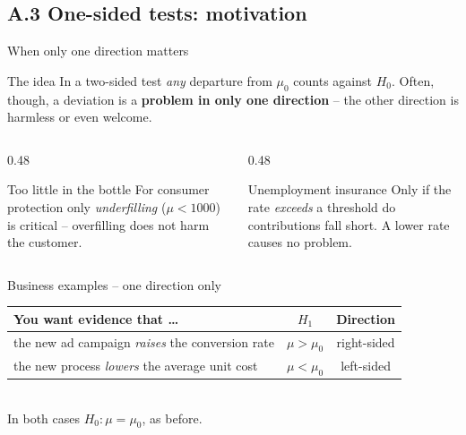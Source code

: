 \documentclass[aspectratio=169,11pt]{beamer}
\begin{document}

\subsection{A.3 One-sided tests: motivation}

\begin{frame}{When only one direction matters}
  \begin{block}{The idea}
    In a two-sided test \emph{any} departure from $\mu_0$ counts against
    $H_0$. Often, though, a deviation is a \textbf{problem in only one
    direction} -- the other direction is harmless or even welcome.
  \end{block}
  \begin{columns}[T]
    \begin{column}{0.48\textwidth}
      \begin{exampleblock}{Too little in the bottle}
        For consumer protection only \emph{underfilling} ($\mu<1000$) is
        critical -- overfilling does not harm the customer.
      \end{exampleblock}
    \end{column}
    \begin{column}{0.48\textwidth}
      \begin{exampleblock}{Unemployment insurance}
        Only if the rate \emph{exceeds} a threshold do contributions fall
        short. A lower rate causes no problem.
      \end{exampleblock}
    \end{column}
  \end{columns}
\end{frame}

\begin{frame}{Business examples -- one direction only}
  \begin{center}
    \renewcommand{\arraystretch}{1.5}
    \begin{tabular}{@{}p{7.8cm}cc@{}}
      \toprule
      \textbf{You want evidence that \ldots} & \textbf{$H_1$}
        & \textbf{Direction}\\
      \midrule
      the new ad campaign \emph{raises} the conversion rate
        & $\mu > \mu_0$ & right-sided\\
      the new process \emph{lowers} the average unit cost
        & $\mu < \mu_0$ & left-sided\\
      \bottomrule
    \end{tabular}\\[4pt]
    {\footnotesize In both cases $H_0:\mu=\mu_0$, as before.}
  \end{center}
\end{frame}
\end{document}
